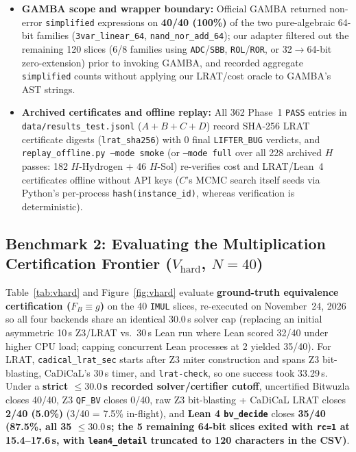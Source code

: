 \documentclass[11pt,a4paper]{article}
\begin{document}
\begin{itemize}[leftmargin=1.5em]
  \item \textbf{GAMBA scope and wrapper boundary:} Official GAMBA returned non-error \texttt{simplified} expressions on \textbf{40/40 (100\%)} of the two pure-algebraic 64-bit families (\texttt{3var\_linear\_64}, \texttt{nand\_nor\_add\_64}); our adapter filtered out the remaining 120 slices (6/8 families using \texttt{ADC}/\texttt{SBB}, \texttt{ROL}/\texttt{ROR}, or 32$\to$64-bit zero-extension) prior to invoking GAMBA, and recorded aggregate \texttt{simplified} counts without applying our LRAT/cost oracle to GAMBA's AST strings.
  \item \textbf{Archived certificates and offline replay:} All 362 Phase~1 \texttt{PASS} entries in \texttt{data/results\_test.jsonl} ($A+B+C+D$) record SHA-256 LRAT certificate digests (\texttt{lrat\_sha256}) with 0 final \texttt{LIFTER\_BUG} verdicts, and \texttt{replay\_offline.py --mode smoke} (or \texttt{--mode full} over all 228 archived $H$ passes: 182 $H$-Hydrogen + 46 $H$-Sol) re-verifies cost and LRAT/Lean~4 certificates offline without API keys ($C$'s MCMC search itself seeds via Python's per-process \texttt{hash(instance\_id)}, whereas verification is deterministic).
\end{itemize}

\subsection{Benchmark 2: Evaluating the Multiplication Certification Frontier ($V_{\mathrm{hard}}$, $N=40$)}

Table~\ref{tab:vhard} and Figure~\ref{fig:vhard} evaluate \textbf{ground-truth equivalence certification ($F_B \equiv g$)} on the 40 \texttt{IMUL} slices, re-executed on November~24, 2026 so all four backends share an identical 30.0\,s solver cap (replacing an initial asymmetric 10\,s Z3/LRAT vs.\ 30\,s Lean run where Lean scored 32/40 under higher CPU load; capping concurrent Lean processes at 2 yielded 35/40). For LRAT, \texttt{cadical\_lrat\_sec} starts after Z3 miter construction and spans Z3 bit-blasting, CaDiCaL's 30\,s timer, and \texttt{lrat-check}, so one success took 33.29\,s. Under a \textbf{strict $\le 30.0$\,s recorded solver/certifier cutoff}, uncertified Bitwuzla closes 40/40, Z3 \texttt{QF\_BV} closes 0/40, raw Z3 bit-blasting + CaDiCaL LRAT closes \textbf{2/40 (5.0\%)} (3/40 = 7.5\% in-flight), and \textbf{Lean 4 \texttt{bv\_decide}} closes \textbf{35/40 (87.5\%, all 35 $\le 30.0$\,s; the 5 remaining 64-bit slices exited with \texttt{rc=1} at 15.4--17.6\,s, with \texttt{lean4\_detail} truncated to 120 characters in the CSV)}.
\end{document}
